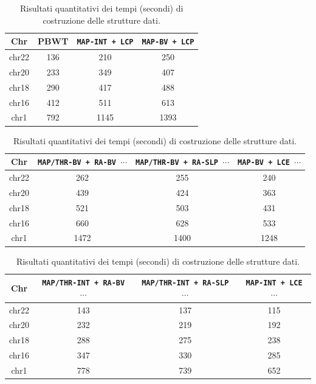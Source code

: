 \begin{table}
  \centering
  \caption{Risultati quantitativi dei tempi (secondi) di costruzione delle
    strutture dati.} 
  \label{tab:maketime}
  \footnotesize
  \begin{tabular}{c||c|c|c} 
    \textbf{Chr}
    & \textbf{PBWT}
    & \textbf{\texttt{MAP-INT \newline+ LCP}}
    & \textbf{\texttt{MAP-BV \newline+ LCP}}\\
    \hline
    \hline
    chr22 & 136 & 210 & 250 \\
    chr20 & 233 & 349 & 407 \\
    chr18 & 290 & 417 & 488 \\
    chr16 & 412 & 511 & 613 \\
    chr1 & 792 & 1145 & 1393
  \end{tabular}
  \vspace{+3mm}
  \vspace{+1mm}
  \begin{tabular}{c||c|c|c} 
    \textbf{Chr}
    & \textbf{\texttt{MAP/THR-BV + RA-BV $\cdots$}}
    & \textbf{\texttt{MAP/THR-BV + RA-SLP $\cdots$}}
    & \textbf{\texttt{MAP-BV + LCE $\cdots$}}\\
    \hline
    \hline
    chr22 & 262 & 255 & 240 \\
    chr20 & 439 & 424 & 363 \\
    chr18 & 521 & 503 & 431 \\
    chr16 & 660 & 628 & 533 \\
    chr1 & 1472 & 1400 & 1248 
  \end{tabular}
  \vspace{+3mm}
  \vspace{+1mm}
  \begin{tabular}{c||c|c|c} 
    \textbf{Chr}
    & \textbf{\texttt{MAP/THR-INT + RA-BV $\cdots$}}
    & \textbf{\texttt{MAP/THR-INT + RA-SLP $\cdots$}}
    & \textbf{\texttt{MAP-INT + LCE $\cdots$}}\\
    \hline
    \hline
    chr22 & 143 & 137 & 115 \\
    chr20 & 232 & 219 & 192 \\
    chr18 & 288 & 275 & 238 \\
    chr16 & 347 & 330 & 285 \\
    chr1 & 778 & 739 & 652

  \end{tabular}
\end{table}
